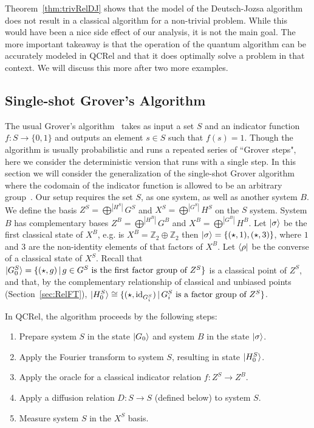 Theorem~\ref{thm:trivRelDJ} shows that the model of the Deutsch-Jozsa algorithm does not result in a classical algorithm for a non-trivial problem.  While this would have been a nice side effect of our analysis, it is not the main goal. The more important takeaway is that the operation of the quantum algorithm can be accurately modeled in QCRel and that it does optimally solve a problem in that context. We will discuss this more after two more examples.

\subsection{Single-shot Grover's Algorithm}
\label{sec:qcrelgrovers}
The usual Grover's algorithm~\cite{grover1996fast} takes as input a set $S$ and an indicator function $f:S\to\{0,1\}$ and outputs an element $s\in S$ such that $f(s)=1$. Though the algorithm is usually probabilistic and runs a repeated series of ``Grover steps", here we consider the deterministic version that runs with a single step. In this section we will consider the generalization of the single-shot Grover algorithm where the codomain of the indicator function is allowed to be an arbitrary group~\cite{vicary-tqa}. Our setup requires the set $S$, as one system, as well as another system $B$. We define the basis $Z^{S}=\bigoplus^{|H^S|}G^S$ and $X^S=\bigoplus^{|G^S|}H^S$ on the $S$ system.  System $B$ has complementary bases $Z^B=\bigoplus^{|H^B|}G^B$ and $X^B=\bigoplus^{|G^B|}H^B$. Let $| \sigma \rangle$ be the first classical state of $X^B$, e.g. is $X^B=\mathbb{Z}_2\oplus\mathbb{Z}_2$ then $| \sigma \rangle=\{(\star,1),(\star,3)\}$, where $1$ and $3$ are the non-identity elements of that factors of $X^B$. Let $\langle \rho |$ be the converse of a classical state of $X^S$. Recall that $| G^S_0 \rangle=\{(\star,g)\,|\,g\in G^S\mbox{ is the first factor group of } Z^S\}$ is a classical point of $Z^S$, and that, by the complementary relationship of classical and unbiased points (Section~\ref{sec:RelFT}), $| H^S_0 \rangle\cong\{(\star,\mbox{id}_{G^S_i})\,|\,G^S_i\mbox{ is a factor group of } Z^S\}$.

In QCRel, the algorithm proceeds by the following steps:
\begin{enumerate}
\item Prepare system $S$ in the state $| G_0 \rangle$ and system $B$ in the state $| \sigma \rangle$.

\item Apply the Fourier transform to system $S$, resulting in state $| H^{S}_0 \rangle$.

\item Apply the oracle for a classical indicator relation $f:Z^S\to Z^B$.

\item Apply a diffusion relation $D:S\to S$ (defined below) to system $S$.

\item Measure system $S$ in the $X^S$ basis.

\end{enumerate}

